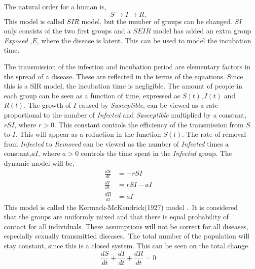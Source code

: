 \documentclass[%
twoside,                 %
final,                   %
10pt]{article}
\begin{document}
\noindent
The natural order for a human is,
\begin{equation}
S \rightarrow I \rightarrow R.
\end{equation}
This model is called $SIR$ model, but the number of groups can be changed. $SI$ only consists of the two first groups and a $SEIR$ model has added an extra group \emph{Exposed} ,$E$, where the disease is latent. This can be used to model the incubation time. 


\vspace{3mm}




\vspace{3mm}


The transmission of the infection and incubation period are elementary factors in the spread of a disease. These are reflected in the terms of the equations. Since this is a SIR model, the incubation time is negligible. The amount of people in each group can be seen as a function of time, expressed as $S(t),I(t)$ and $R(t)$. The growth of $I$ caused by \emph{Susceptible}, can be viewed as a rate proportional to the number of \emph{Infected} and \emph{Susceptible} multiplied by a constant,$rSI$, where $r>0$. This constant controls the efficiency of the transmission from $S$ to $I$. This will appear as a reduction in the function $S(t)$. The rate of removal from \emph{Infected} to \emph{Removed} can be viewed as the number of \emph{Infected} times a constant,$aI$, where $a>0$ controls the time spent in the \emph{Infected} group. The dynamic model will be,
\begin{equation} \label{eq:SIR_model}
	\begin{aligned} 
	\frac{dS}{dt} &= -rSI \\ 
	\frac{dI}{dt} &= rSI-aI \\ 
	\frac{dR}{dt} &= aI 
	\end{aligned}
\end{equation}
This model is called the Kermack-McKendrick(1927) model \cite[p.~320]{murray2002mathematical}.~It is considered that the groups are uniformly mixed and that there is equal probability of contact for all individuals. These assumptions will not be correct for all diseases, especially sexually transmitted diseases. The total number of the population will stay constant, since this is a closed system. This can be seen on the total change.
\begin{equation}
\frac{dS}{dt} + \frac{dI}{dt} + \frac{dR}{dt} = 0
\end{equation}
\end{document}
